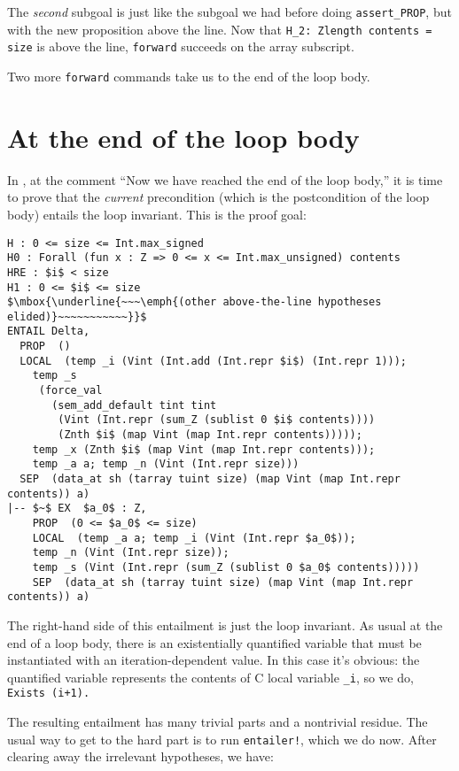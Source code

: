 \documentclass[12pt,fleqn,openany,oneside,showtrims]{memoir}
\begin{document}
The \emph{second} subgoal is just like the subgoal
we had before doing \lstinline{assert_PROP},
but with the new proposition above the line.
Now that
\lstinline{H_2: Zlength contents = size} is above the line,
\lstinline{forward} succeeds on the array subscript.

Two more \lstinline{forward} commands take us to the end
of the loop body.

\chapter{At the end of the loop body}
In , at the comment ``Now we have reached
the end of the loop body,'' it is time to prove that the \emph{current}
precondition (which is the postcondition of the loop body) entails
the loop invariant.  This is the proof goal:
\begin{lstlisting}
H : 0 <= size <= Int.max_signed
H0 : Forall (fun x : Z => 0 <= x <= Int.max_unsigned) contents
HRE : $i$ < size
H1 : 0 <= $i$ <= size
$\mbox{\underline{~~~\emph{(other above-the-line hypotheses elided)}~~~~~~~~~~~}}$
ENTAIL Delta,
  PROP  ()
  LOCAL  (temp _i (Vint (Int.add (Int.repr $i$) (Int.repr 1)));
    temp _s
     (force_val
       (sem_add_default tint tint
        (Vint (Int.repr (sum_Z (sublist 0 $i$ contents))))
        (Znth $i$ (map Vint (map Int.repr contents)))));
    temp _x (Znth $i$ (map Vint (map Int.repr contents)));
    temp _a a; temp _n (Vint (Int.repr size)))
  SEP  (data_at sh (tarray tuint size) (map Vint (map Int.repr contents)) a)
|-- $~$ EX  $a_0$ : Z,
    PROP  (0 <= $a_0$ <= size)
    LOCAL  (temp _a a; temp _i (Vint (Int.repr $a_0$));
    temp _n (Vint (Int.repr size));
    temp _s (Vint (Int.repr (sum_Z (sublist 0 $a_0$ contents)))))
    SEP  (data_at sh (tarray tuint size) (map Vint (map Int.repr contents)) a)
\end{lstlisting}
The right-hand side of this entailment is just the loop invariant.
As usual at the end of a loop body, there is an existentially
quantified variable that must be instantiated with an iteration-dependent value.
In this case it's obvious: the quantified variable represents the
contents of C local variable \lstinline{_i}, so we do,
\lstinline{Exists (i+1).}

The resulting entailment has many trivial parts and a nontrivial residue.
The usual way to get to the hard part is to run \lstinline{entailer!},
which we do now.  After clearing away the irrelevant hypotheses, we have:
\end{document}
